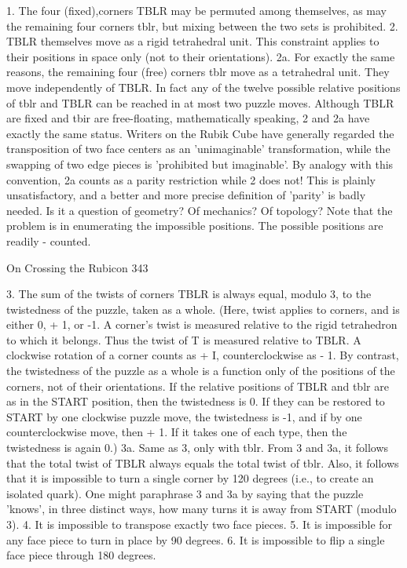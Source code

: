    1. The four (fixed),corners TBLR may be permuted among themselves, as may
      the remaining four corners tblr, but mixing between the two sets is
      prohibited.
   2. TBLR themselves move as a rigid tetrahedral unit. This constraint applies to
      their positions in space only (not to their orientations).
   2a. For exactly the same reasons, the remaining four (free) corners tblr move as
      a tetrahedral unit. They move independently of TBLR. In fact any of the
      twelve possible relative positions of tblr and TBLR can be reached in at most
      two puzzle moves.
      Although TBLR are fixed and tbir are free-floating, mathematically
      speaking, 2 and 2a have exactly the same status. Writers on the Rubik Cube
      have generally regarded the transposition of two face centers as an
      'unimaginable' transformation, while the swapping of two edge pieces is
      'prohibited but imaginable'. By analogy with this convention, 2a counts as a
      parity restriction while 2 does not! This is plainly unsatisfactory, and a better
      and more precise definition of 'parity' is badly needed. Is it a question of
      geometry? Of mechanics? Of topology? Note that the problem is in
      enumerating the impossible positions. The possible positions are readily -
      counted.



On Crossing the Rubicon                                                               343

  3. The sum of the twists of corners TBLR is always equal, modulo 3, to the
      twistedness of the puzzle, taken as a whole.
  (Here, twist applies to corners, and is either 0, + 1, or -1. A corner's twist is
      measured relative to the rigid tetrahedron to which it belongs. Thus the twist
      of T is measured relative to TBLR. A clockwise rotation of a corner counts
      as + I, counterclockwise as - 1. By contrast, the twistedness of the puzzle as a
      whole is a function only of the positions of the corners, not of their
      orientations. If the relative positions of TBLR and tblr are as in the START
      position, then the twistedness is 0. If they can be restored to START by one
      clockwise puzzle move, the twistedness is -1, and if by one counterclockwise
      move, then + 1. If it takes one of each type, then the twistedness is again 0.)
  3a. Same as 3, only with tblr.
  From 3 and 3a, it follows that the total twist of TBLR always equals the total
      twist of tblr. Also, it follows that it is impossible to turn a single corner by
      120 degrees (i.e., to create an isolated quark). One might paraphrase 3 and 3a
      by saying that the puzzle 'knows', in three distinct ways, how many turns it is
      away from START (modulo 3).
  4. It is impossible to transpose exactly two face pieces.
  5. It is impossible for any face piece to turn in place by 90 degrees. 6. It is
      impossible to flip a single face piece through 180 degrees.

